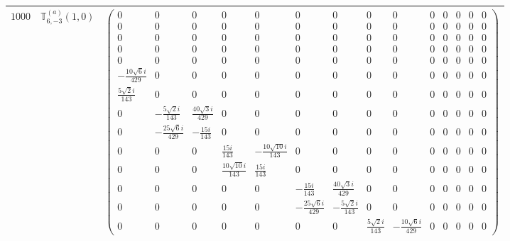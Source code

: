 \documentclass[fleqn,8pt,landscape]{jsarticle}
\begin{document}
\begin{center}
\begin{longtable}{ccc}
$ 1000 $ & $ \mathbb{T}_{6,-3}^{(a)}(1,0) $ & $ \begin{pmatrix} 0 & 0 & 0 & 0 & 0 & 0 & 0 & 0 & 0 & 0 & 0 & 0 & 0 & 0 \\ 0 & 0 & 0 & 0 & 0 & 0 & 0 & 0 & 0 & 0 & 0 & 0 & 0 & 0 \\ 0 & 0 & 0 & 0 & 0 & 0 & 0 & 0 & 0 & 0 & 0 & 0 & 0 & 0 \\ 0 & 0 & 0 & 0 & 0 & 0 & 0 & 0 & 0 & 0 & 0 & 0 & 0 & 0 \\ 0 & 0 & 0 & 0 & 0 & 0 & 0 & 0 & 0 & 0 & 0 & 0 & 0 & 0 \\ - \frac{10 \sqrt{6} i}{429} & 0 & 0 & 0 & 0 & 0 & 0 & 0 & 0 & 0 & 0 & 0 & 0 & 0 \\ \frac{5 \sqrt{2} i}{143} & 0 & 0 & 0 & 0 & 0 & 0 & 0 & 0 & 0 & 0 & 0 & 0 & 0 \\ 0 & - \frac{5 \sqrt{2} i}{143} & \frac{40 \sqrt{3} i}{429} & 0 & 0 & 0 & 0 & 0 & 0 & 0 & 0 & 0 & 0 & 0 \\ 0 & - \frac{25 \sqrt{6} i}{429} & - \frac{15 i}{143} & 0 & 0 & 0 & 0 & 0 & 0 & 0 & 0 & 0 & 0 & 0 \\ 0 & 0 & 0 & \frac{15 i}{143} & - \frac{10 \sqrt{10} i}{143} & 0 & 0 & 0 & 0 & 0 & 0 & 0 & 0 & 0 \\ 0 & 0 & 0 & \frac{10 \sqrt{10} i}{143} & \frac{15 i}{143} & 0 & 0 & 0 & 0 & 0 & 0 & 0 & 0 & 0 \\ 0 & 0 & 0 & 0 & 0 & - \frac{15 i}{143} & \frac{40 \sqrt{3} i}{429} & 0 & 0 & 0 & 0 & 0 & 0 & 0 \\ 0 & 0 & 0 & 0 & 0 & - \frac{25 \sqrt{6} i}{429} & - \frac{5 \sqrt{2} i}{143} & 0 & 0 & 0 & 0 & 0 & 0 & 0 \\ 0 & 0 & 0 & 0 & 0 & 0 & 0 & \frac{5 \sqrt{2} i}{143} & - \frac{10 \sqrt{6} i}{429} & 0 & 0 & 0 & 0 & 0 \end{pmatrix} $ \\ \hline

\end{longtable}
\end{center}
\end{document}

